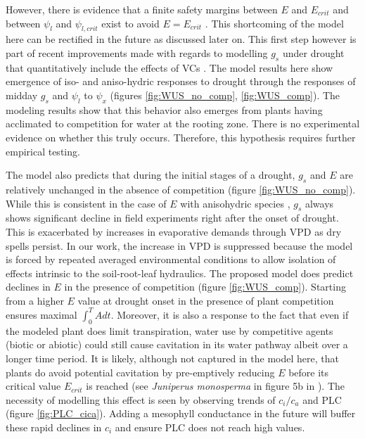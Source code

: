 \documentclass[utf8]{frontiersSCNS} %
\begin{document}
However, there is evidence that a finite safety margins between $E$ and $E_{crit}$ and between $\psi_l$ and $\psi_{l, crit}$ exist to avoid $E = E_{crit}$ \citep{mcdowell_mechanisms_2008, plaut_hydraulic_2012}. This shortcoming of the model here can be rectified in the future as discussed later on. This first step however is part of recent improvements made with regards to modelling $g_s$ under drought that quantitatively include the effects of VCs \citep{sperry_what_2015, sperry_predicting_2017}. The model results here show emergence of iso- and aniso-hydric responses to drought through the responses of midday $g_s$ and $\psi_l$ to $\psi_x$ (figures \ref{fig:WUS_no_comp}, \ref{fig:WUS_comp}). The modeling results show that this behavior also emerges from plants having acclimated to competition for water at the rooting zone. There is no experimental evidence on whether this truly occurs. Therefore, this hypothesis requires further empirical testing.

The model also predicts that during the initial stages of a drought, $g_s$ and $E$ are relatively unchanged in the absence of competition (figure \ref{fig:WUS_no_comp}). While this is consistent in the case of $E$ with anisohydric species \citep{hochberg_iso/anisohydry:_2018}, $g_s$ always shows significant decline in field experiments right after the onset of drought. This is exacerbated by increases in evaporative demands through VPD as dry spells persist. In our work, the increase in VPD is suppressed because the model is forced by repeated  averaged environmental conditions to allow isolation of effects intrinsic to the soil-root-leaf hydraulics. The proposed model does predict declines in $E$ in the presence of competition (figure \ref{fig:WUS_comp}). Starting from a higher $E$ value at drought onset in the presence of plant competition ensures maximal $\int_0^T A dt$. Moreover, it is also a response to the fact that even if the modeled plant does limit transpiration, water use by competitive agents (biotic or abiotic) could still cause cavitation in its water pathway albeit over a longer time period. It is likely, although not captured in the model here, that plants do avoid potential cavitation by pre-emptively reducing $E$ before its critical value $E_{crit}$ is reached (see \textit{Juniperus monosperma} in figure 5b in \citet{garciaforner_responses_2016}).  The necessity of modelling this effect is seen by observing trends of $c_i / c_a$ and PLC (figure \ref{fig:PLC_cica}). Adding a mesophyll conductance in the future will buffer these rapid declines in $c_i$ and ensure PLC does not reach high values.
\end{document}

